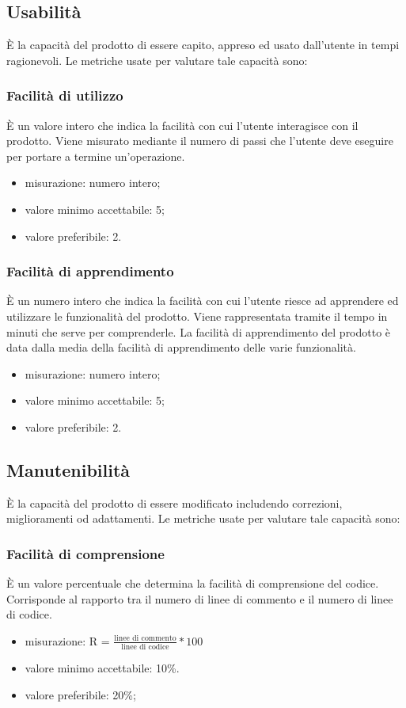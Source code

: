 \subsection{Usabilità}
È la capacità del prodotto di essere capito, appreso ed usato dall'utente in tempi ragionevoli.
Le metriche usate per valutare tale capacità sono:

	\subsubsection*{Facilità di utilizzo}
	È un valore intero che indica la facilità con cui l'utente interagisce con il prodotto. Viene misurato mediante il numero di passi che l'utente deve eseguire per portare a termine un'operazione.
	\begin{itemize}
		\item {misurazione: numero intero;}
		\item {valore minimo accettabile: 5;}
		\item {valore preferibile: 2.}
		\end{itemize}
		
	\subsubsection*{Facilità di apprendimento}
	È un numero intero che indica la facilità con cui l'utente riesce ad apprendere ed utilizzare le funzionalità del prodotto. Viene rappresentata tramite il tempo in minuti che serve per comprenderle. La facilità di apprendimento del prodotto è data dalla media della facilità di apprendimento delle varie funzionalità.
	\begin{itemize}
		\item {misurazione: numero intero;}
		\item {valore minimo accettabile: 5;}
		\item {valore preferibile: 2.}
	\end{itemize}
	
\subsection{Manutenibilità}
È la capacità del prodotto di essere modificato includendo correzioni, miglioramenti od adattamenti. 
Le metriche usate per valutare tale capacità sono:

	\subsubsection*{Facilità di comprensione}
	È un valore percentuale che determina la facilità di comprensione del codice. Corrisponde al rapporto tra il numero di linee di commento e il numero di linee di codice.
	\begin{itemize}
		\item{misurazione: R = $\displaystyle\frac{\mbox{linee di commento}}{\mbox{linee di codice}}*100$}
		\item {valore minimo accettabile: 10\%.}
		\item {valore preferibile: 20\%;}
	\end{itemize}
	
